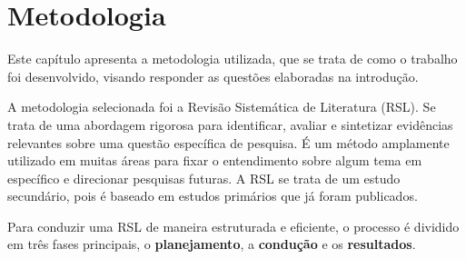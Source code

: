 \chapter[Metodologia]{Metodologia}

Este capítulo apresenta a metodologia utilizada, que se trata de como o trabalho foi desenvolvido, visando responder as questões elaboradas na introdução.

A metodologia selecionada foi a Revisão Sistemática de Literatura (RSL). Se trata de uma abordagem rigorosa para identificar, avaliar e sintetizar evidências relevantes sobre uma questão específica de pesquisa.
É um método amplamente utilizado em muitas áreas para fixar o entendimento sobre algum tema em específico e direcionar pesquisas futuras. A RSL se trata de um estudo secundário, pois é baseado em estudos primários que já foram publicados.

Para conduzir uma RSL de maneira estruturada e eficiente, o processo é dividido em três fases principais, o \textbf{planejamento}, a \textbf{condução} e os \textbf{resultados}.

